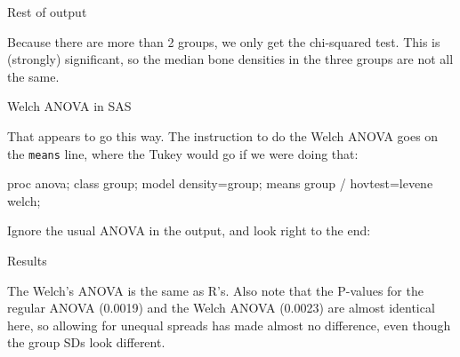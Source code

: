 \documentclass[unknownkeysallowed]{beamer}\usepackage[]{graphicx}\usepackage[]{color}
\begin{document}
\begin{frame}[fragile]{Rest of output}
  
  
Because there are more than 2 groups, we only get the chi-squared
test. This is (strongly) significant, so the median bone densities in
the three groups are not all the same.

\end{frame}

\begin{frame}[fragile]{Welch ANOVA in SAS}
  
That appears to go this way. The instruction to do the Welch ANOVA
goes on the \texttt{means} line, where the Tukey would go if we were
doing that:

\begin{Sascode}[store=jc]
proc anova;
  class group;
  model density=group;
  means group / hovtest=levene welch;
\end{Sascode}

Ignore the usual ANOVA in the output, and look right to the end:
  
\end{frame}

\begin{frame}[fragile]{Results}
  

The Welch's ANOVA is the same as R's. Also note that the P-values for
the regular ANOVA (0.0019) and the Welch ANOVA (0.0023) are almost
identical here, so allowing for unequal spreads has made almost no
difference, even though the group SDs look different.
  
\end{frame}
\end{document}
